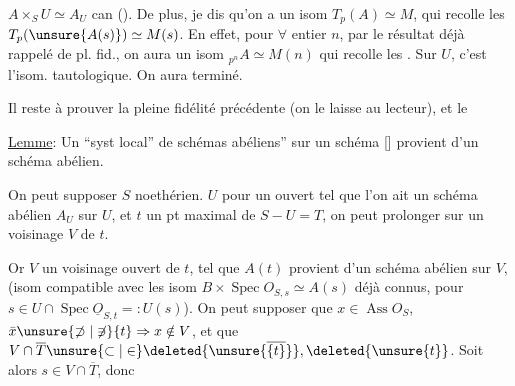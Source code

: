 $A\times_S U\simeq A_U$ can (). De plus, je dis qu'on a un isom $T_p(A)\simeq M$, qui recolle les $T_p(\unsure{A(s)})\simeq M(s)$. En effet, pour $\forall$ entier $n$, par le résultat déjà rappelé de pl. fid., on aura un isom  ${}_{p^n}A\simeq M(n)$ qui recolle les
. Sur $U$, c'est l'isom. tautologique. On aura terminé.

Il reste à prouver la pleine fidélité précédente (on le laisse au lecteur), et le

\uline{Lemme}: Un ``syst local'' de schémas abéliens'' sur un schéma []  provient d'un schéma abélien.

On peut supposer $S$ noethérien.   $U$  pour un ouvert tel que l'on ait un schéma abélien $A_U$ sur $U$, et $t$ un pt maximal de $S-U=T$, on peut prolonger sur un voisinage $V$ de $t$.

Or  $V$ un voisinage ouvert de $t$, tel que $A(t)$ provient d'un schéma abélien sur $V$, 
(isom compatible avec les isom $B\times\operatorname{Spec}O_{S,s}\simeq A(s)$ déjà connus, pour $s\in U\cap\operatorname{Spec}\underline O_{S,t}=:U(s)$).  On peut supposer que $x\in\operatorname{Ass}O_S$, $\bar x\unsure{\not\supset|\not\ni}\{t\}\Rightarrow x\notin V$, et que $V\cap\overline T\unsure{\subset|\in}\deleted{\unsure{\overline{\{t\}}}},\deleted{\unsure{t}}$. Soit alors $s\in V\cap\overline T$, donc 
